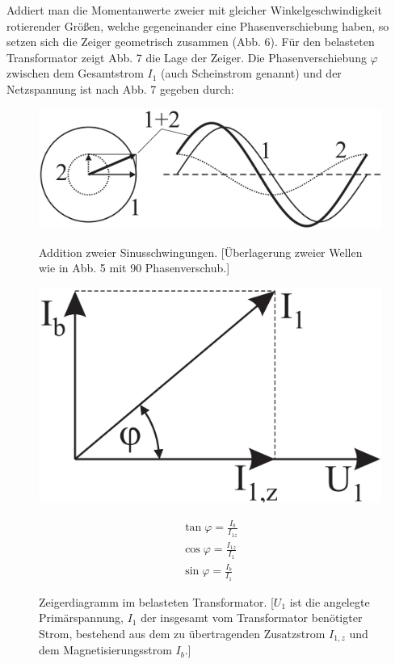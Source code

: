 \documentclass[12pt,a4paper,twoside]{article}
\theoremstyle{definition}
\begin{document}
Addiert man die Momentanwerte zweier mit gleicher Winkelgeschwindigkeit rotierender Größen, welche gegeneinander eine Phasenverschiebung haben, so setzen sich die Zeiger geometrisch zusammen (Abb. 6). Für den belasteten Transformator zeigt Abb. 7 die Lage der Zeiger. Die Phasenverschiebung $\varphi$ zwischen dem Gesamtstrom $I_1$ (auch Scheinstrom genannt) und der Netzspannung ist nach Abb. 7 gegeben durch:
\begin{figure}[H]
    \centering
    \begin{minipage}[b]{0.3\textwidth}
        \includegraphics[width=\textwidth]{grundlagen/abb6}
        \caption{Addition zweier Sinusschwingungen. [Überlagerung zweier Wellen wie in Abb. 5 mit \SI{90}{\deg} Phasenverschub.]}
    \end{minipage}
    \hfill
    \begin{minipage}[b]{0.3\textwidth}
        \includegraphics[width=\textwidth]{grundlagen/abb7}
        \caption{Zeigerdiagramm im belasteten Transformator. [$U_1$ ist die angelegte Primärspannung, $I_1$ der insgesamt vom Transformator benötigter Strom, bestehend aus dem zu übertragenden Zusatzstrom $I_{1,z}$ und dem Magnetisierungsstrom $I_b$.]}
    \end{minipage}
    \hfill
    \begin{minipage}[b]{0.3\textwidth}
        \begin{gather}
            \tan \varphi = \frac{I_b}{I_{1z}} \\
            \cos \varphi = \frac{I_{1z}}{I_1} \\
            \sin \varphi = \frac{I_b}{I_1}
        \end{gather}
    \end{minipage}
\end{figure}
\end{document}
